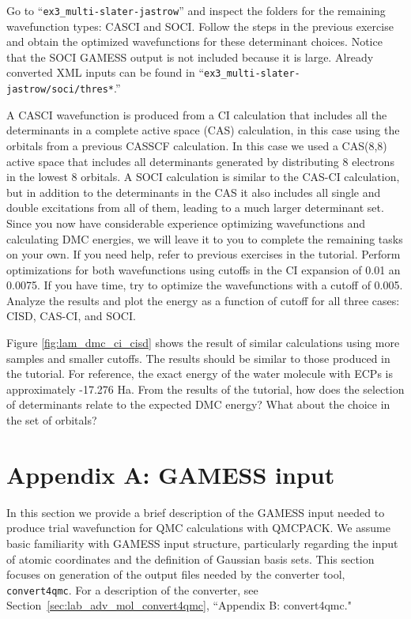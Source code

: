 Go to “\texttt{ex3\_multi-slater-jastrow}” and inspect the folders for the remaining wavefunction types: CASCI and SOCI. Follow the steps in the previous exercise and obtain the optimized wavefunctions for these determinant choices. Notice that the SOCI GAMESS output is not included because it is large. Already converted XML inputs can be found in ``\texttt{ex3\_multi-slater-jastrow/soci/thres*}.'' %

A CASCI wavefunction is produced from a CI calculation that includes all the determinants 
in a complete active space (CAS) calculation, in this case using the orbitals from a previous CASSCF
calculation. In this case we used a CAS(8,8) active space that includes all determinants
generated by distributing 8 electrons in the lowest 8 orbitals. A SOCI calculation is similar
to the CAS-CI calculation, but in addition to the determinants in the CAS it also includes
all single and double excitations from all of them, leading to a much larger determinant
set. Since you now have considerable experience optimizing wavefunctions and calculating
DMC energies, we will leave it to you to complete the remaining tasks on your own.
If you need help, refer to previous exercises in the tutorial. Perform optimizations for both
wavefunctions using cutoffs in the CI expansion of 0.01 an 0.0075. If you have time, try to optimize the wavefunctions with a cutoff of 0.005. Analyze the results and plot
the energy as a function of cutoff for all three cases: CISD, CAS-CI, and SOCI.

Figure  \ref{fig:lam_dmc_ci_cisd} shows the result of similar calculations using more samples and smaller cutoffs.
The results should be similar to those produced in the tutorial. For reference, the exact
energy of the water molecule with ECPs is approximately -17.276 Ha. From the results of the
tutorial, how does the selection of determinants relate to the expected DMC energy?
What about the choice in the set of orbitals?


\newpage
\section{Appendix A: GAMESS input}\label{sec:lab_adv_mol_gamess}
In this section we provide a brief description of the GAMESS input needed to produce
trial wavefunction for QMC calculations with QMCPACK. We assume basic familiarity
with GAMESS input structure, particularly regarding the input of atomic coordinates and
the definition of Gaussian basis sets. This section focuses on generation of the output
files needed by the converter tool, \texttt{convert4qmc}. For a description of the converter, see Section~\ref{sec:lab_adv_mol_convert4qmc}, ``Appendix B: convert4qmc."


